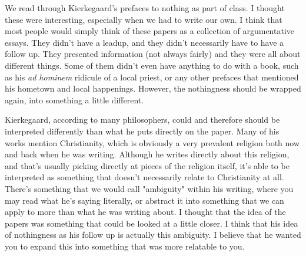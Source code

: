 \documentclass[12pt]{article}
\begin{document}
  We read through Kierkegaard's prefaces to nothing as part of class. I thought these were interesting, especially
  when we had to write our own. I think that most people would simply think of these papers as a collection of
  argumentative essays. They didn't have a leadup, and they didn't necessarily have to have a follow up. They 
  presented information (not always fairly) and they were all about different things. Some of them didn't even have
  anything to do with a book, such as his \textit{ad hominem} ridicule of a local priest, or any other prefaces that
  mentioned his hometown and local happenings. However, the nothingness should be wrapped again, into something a
  little different.

  Kierkegaard, according to many philosophers, could and therefore should be interpreted differently than what he
  puts directly on the paper. Many of his works mention Christianity, which is obviously a very prevalent religion
  both now and back when he was writing. Although he writes directly about this religion, and that's usually picking
  directly at pieces of the religion itself, it's able to be interpreted as something that doesn't necessarily relate
  to Christianity at all. There's something that we would call "ambiguity" within his writing, where you may read
  what he's saying literally, or abstract it into something that we can apply to more than what he was writing about.
  I thought that the idea of the papers was something that could be looked at a little closer. I think that his idea
  of nothingness as his follow up is actually this ambiguity. I believe that he wanted you to expand this into something
  that was more relatable to you.

  
\end{document}
